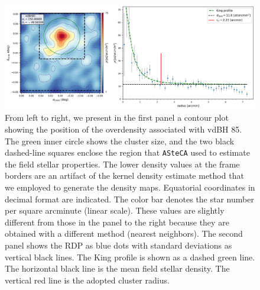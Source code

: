 \documentclass[draft]{aa}
\begin{document}
\begin{figure}[ht]
    \centering
    \includegraphics[width=\hsize]{../figs/dmap_vdbh85.png}
\caption{From left to right, we present in the first panel
a contour plot showing the position of the overdensity associated with vdBH 85.
The green inner circle shows the cluster size, and the two black dashed-line
squares enclose the region that \texttt{ASteCA} used to estimate the field
stellar properties. The lower density values at the frame borders are an
artifact of the kernel density estimate method that we employed to generate the density
maps.
Equatorial coordinates in decimal format are indicated.
The color bar denotes the star number per square arcminute (linear scale).
These values are slightly different from those in the panel to the right
because they are obtained with a different method (nearest neighbors).
%
The second panel shows the RDP as blue dots with standard deviations as
vertical black lines. The King profile is shown as a dashed green line. The
horizontal black line is the mean field stellar density. The vertical red line is the
adopted cluster radius.
}
    \label{fig:struct_vdBH85}
\end{figure}
\end{document}
